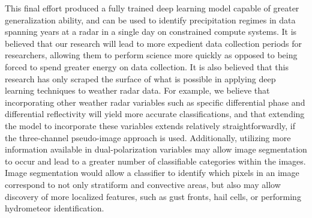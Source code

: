 This final effort produced a fully trained deep learning model capable of greater generalization ability, and can be used to identify precipitation regimes in data spanning years at a radar in a single day on constrained compute systems.
It is believed that our research will lead to more expedient data collection periods for researchers, allowing them to perform science more quickly as opposed to being forced to spend greater energy on data collection.
It is also believed that this research has only scraped the surface of what is possible in applying deep learning techniques to weather radar data.
For example, we believe that incorporating other weather radar variables such as specific differential phase and differential reflectivity will yield more accurate classifications, and that extending the model to incorporate these variables extends relatively straightforwardly, if the three-channel pseudo-image approach is used.
Additionally, utilizing more information available in dual-polarization variables may allow image segmentation to occur and lead to a greater number of classifiable categories within the images.
Image segmentation would allow a classifier to identify which pixels in an image correspond to not only stratiform and convective areas, but also may allow discovery of more localized features, such as gust fronts, hail cells, or performing hydrometeor identification.


